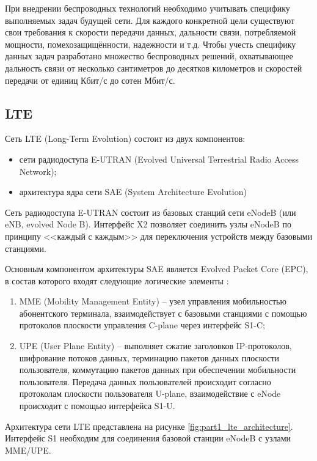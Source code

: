При внедрении беспроводных технологий необходимо учитывать специфику выполняемых задач будущей сети. Для каждого конкретной цели существуют свои требования к скорости передачи данных, дальности связи, потребляемой мощности, помехозащищённости, надежности и т.д. Чтобы учесть специфику данных задач разработано множество беспроводных решений, охватывающее дальность связи от несколько сантиметров до десятков километров и скоростей передачи от единиц Кбит/с до сотен Мбит/с.

\subsection{LTE}

Сеть LTE (Long-Term Evolution) состоит из двух компонентов:
\begin{itemize}
    \item сети радиодоступа E-UTRAN (Evolved Universal Terrestrial Radio Access Network);
    \item архитектура ядра сети SAE (System Architecture Evolution)
\end{itemize}

Сеть радиодоступа E-UTRAN состоит из базовых станций сети eNodeB (или eNB, evolved Node B). Интерфейс X2 позволяет соединить узлы eNodeB по принципу <<каждый с каждым>> для переключения устройств между базовыми станциями. 

Основным компонентом архитектуры SAE является Evolved Packet Core (EPC), в состав которого входят следующие логические элементы \cite{Tikhvinsky2014}:

\begin{enumerate}
  \item MME (Mobility Management Entity) -- узел управления мобильностью абонентского терминала, взаимодействует с базовыми станциями с помощью протоколов плоскости управления C-plane через интерфейс S1-C;
  \item UPE (User Plane Entity) -- выполняет сжатие заголовков IP-протоколов, шифрование потоков данных, терминацию пакетов данных плоскости пользователя, коммутацию пакетов данных при обеспечении мобильности пользователя. Передача данных пользователей происходит согласно протоколам плоскости пользователя U-plane, взаимодействие с eNode происходит с помощью интерфейса S1-U.
\end{enumerate}

Архитектура сети LTE представлена на рисунке \cref{fig:part1_lte_architecture}. Интерфейс S1 необходим для соединения базовой станции eNodeB с узлами MME/UPE. 

